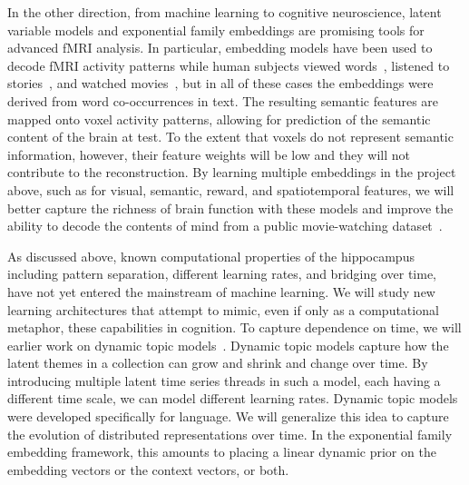 In the other direction, from machine learning to cognitive neuroscience,
latent variable models and exponential family embeddings
are promising tools for advanced fMRI analysis. In particular,
embedding models have been used to decode fMRI activity patterns while
human subjects viewed words~\citep{Mitchell:2008}, listened to
stories~\citep{Huth:2016}, and watched movies~\citep{Vodrahalli:2017},
but in all of these cases the embeddings were derived from word
co-occurrences in text. The resulting semantic features are mapped onto
voxel activity patterns, allowing for prediction of the semantic content
of the brain at test. To the extent that voxels do not
represent semantic information, however, their feature weights will
be low and they will not contribute to the reconstruction. By learning
multiple embeddings in the project above, such as for visual, semantic,
reward, and spatiotemporal features, we will better capture the richness
of brain function with these models and improve the ability to decode
the contents of mind from a public movie-watching dataset~\citep[as used
in][]{Vodrahalli:2017}.

As discussed above, known computational properties of the hippocampus
including pattern separation, different learning rates, and bridging
over time, have not yet entered the mainstream of machine learning.
We will study new learning architectures that attempt to mimic, even
if only as a computational metaphor, these capabilities in cognition.
To capture dependence on time, we will earlier work on dynamic topic
models~\citep{Blei:2006d}. Dynamic topic models capture how the
latent themes in a collection can grow and shrink and change over
time. By introducing multiple latent time series threads in such a
model, each having a different time scale, we can model different
learning rates. Dynamic topic models were
developed specifically for language.  We will generalize this idea to
capture the evolution of distributed representations over time. In
the exponential family embedding framework, this amounts to placing a
linear dynamic prior on the embedding vectors or the context vectors,
or both.
